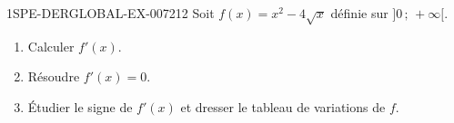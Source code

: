 \begin{exercice}{1SPE-DERGLOBAL-EX-007}{2}{12}
Soit $f(x) = x^2 - 4\sqrt{x}$ définie sur $]0\,;\,+\infty[$.
\begin{enumerate}
  \item Calculer $f'(x)$.
  \item Résoudre $f'(x) = 0$.
  \item Étudier le signe de $f'(x)$ et dresser le tableau de variations de $f$.
\end{enumerate}
\end{exercice}
